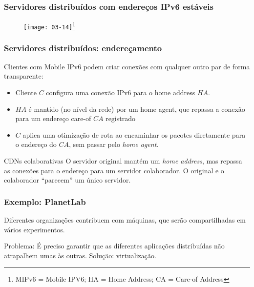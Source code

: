 \documentclass[Ligatures=TeX,table,brazil,svgnames,usetotalslideindicator,compress,10pt]{beamer}
\begin{document}
\begin{frame}
  \frametitle{Servidores distribuídos com endereços IPv6 estáveis}
  \begin{figure}[centering]
    \centering
    \texttt{[image: 03-14]}\footnote{MIPv6 = Mobile IPV6; HA = Home Address; CA = Care-of Address}
  \end{figure}
\end{frame}

\begin{frame}
  \frametitle{Servidores distribuídos: endereçamento}
  Clientes com Mobile IPv6 podem criar conexões com qualquer outro par de forma transparente:
  \begin{itemize}
  \item Cliente $C$ configura uma conexão IPv6 para o \alert{home address} $HA$.
  \item $HA$ é mantido (no nível da rede) por um \alert{home agent}, que repassa a conexão para um endereço \alert{care-of} $CA$ registrado
  \item $C$ aplica uma \alert{otimização de rota} ao encaminhar os pacotes diretamente para o endereço do $CA$, sem passar pelo \textit{home agent}.
  \end{itemize}

  \pause
  \begin{exampleblock}{CDNs colaborativas}
    O servidor original mantém um \textit{home address}, mas repassa as conexões para o endereço para um servidor colaborador. O original e o colaborador ``parecem'' um único servidor.
  \end{exampleblock}

\end{frame}

\begin{frame}
  \frametitle{Exemplo: PlanetLab}

  \begin{block}{}
    Diferentes organizações contribuem com máquinas, que serão
    \alert{compartilhadas} em vários experimentos.
  \end{block}

  \begin{alertblock}{Problema:}
    É preciso garantir que as diferentes aplicações distribuídas não atrapalhem umas às outras. Solução: \alert{virtualização}.
  \end{alertblock}

\end{frame}
\end{document}
